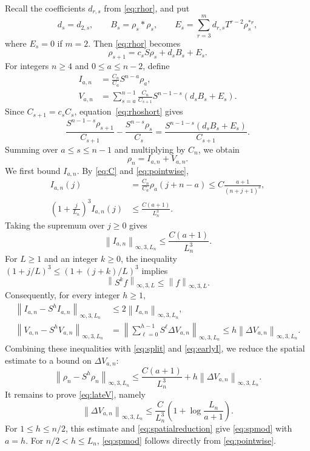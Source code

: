 \documentclass[11pt,letterpaper,reqno]{amsart}
\numberwithin{equation}{section}
\theoremstyle{plain}
\theoremstyle{remark}
\newcommand{\norm}[1]{\left\lVert#1\right\rVert}
\begin{document}
Recall the coefficients $d_{r,s}$ from \eqref{eq:rhor}, and put
\[
 d_s=d_{2,s},\qquad B_s=\rho_s*\rho_s,\qquad
 E_s=\sum_{r=3}^m d_{r,s}T^{r-2}\rho_s^{*r},
\]
where $E_s=0$ if $m=2$. Then \eqref{eq:rhor} becomes
\begin{equation}\label{eq:rhoshort}
 \rho_{s+1}=c_sS\rho_s+d_sB_s+E_s.
\end{equation}
For integers $n\ge4$ and $0\le a\le n-2$, define
\begin{align*}
 I_{a,n}&=\frac{C_n}{C_a}S^{n-a}\rho_a,\\
 V_{a,n}&=\sum_{s=a}^{n-1}\frac{C_n}{C_{s+1}}
                   S^{n-1-s}(d_sB_s+E_s).
\end{align*}
Since $C_{s+1}=c_sC_s$, equation~\eqref{eq:rhoshort} gives
\[
 \frac{S^{n-1-s}\rho_{s+1}}{C_{s+1}}
 -\frac{S^{n-s}\rho_s}{C_s}
 =\frac{S^{n-1-s}(d_sB_s+E_s)}{C_{s+1}}.
\]
Summing over $a\le s\le n-1$ and multiplying by $C_n$, we obtain
\begin{equation}\label{eq:split}
 \rho_n=I_{a,n}+V_{a,n}.
\end{equation}
We first bound $I_{a,n}$. By \eqref{eq:C} and \eqref{eq:pointwise}, 
\[
 \begin{aligned}
 I_{a,n}(j)
 &=\frac{C_n}{C_a}\rho_a(j+n-a)
 \le C\frac{a+1}{(n+j+1)^3},\\
 \left(1+\frac j{L_n}\right)^3 I_{a,n}(j)
 &\le \frac{C(a+1)}{L_n^3}.
 \end{aligned}
\]
Taking the supremum over $j\ge0$ gives
\begin{equation}\label{eq:earlyI}
 \norm{I_{a,n}}_{\infty,3,L_n}
 \le\frac{C(a+1)}{L_n^3}.
\end{equation}
For $L\ge1$ and an integer $k\ge0$, the inequality
$(1+j/L)^3\le(1+(j+k)/L)^3$ implies
\[
 \norm{S^kf}_{\infty,3,L}\le\norm f_{\infty,3,L}.
\]
Consequently, for every integer $h\ge1$,
\[
 \begin{aligned}
 \norm{I_{a,n}-S^hI_{a,n}}_{\infty,3,L_n}
 &\le2\norm{I_{a,n}}_{\infty,3,L_n},\\
 \norm{V_{a,n}-S^hV_{a,n}}_{\infty,3,L_n}
 &=\left\|\sum_{\ell=0}^{h-1}S^\ell\Delta V_{a,n}
       \right\|_{\infty,3,L_n}
 \le h\norm{\Delta V_{a,n}}_{\infty,3,L_n}.
 \end{aligned}
\]
Combining these inequalities with \eqref{eq:split} and \eqref{eq:earlyI},
we reduce the spatial estimate to a bound on $\Delta V_{a,n}$:
\begin{equation}\label{eq:spatialreduction}
 \norm{\rho_n-S^h\rho_n}_{\infty,3,L_n}
 \le\frac{C(a+1)}{L_n^3}
       +h\norm{\Delta V_{a,n}}_{\infty,3,L_n}.
\end{equation}
It remains to prove \eqref{eq:lateV}, namely
\[
 \norm{\Delta V_{a,n}}_{\infty,3,L_n}
 \le \frac{C}{L_n^3}
       \left(1+\log\frac{L_n}{a+1}\right).
\]
For $1\le h\le n/2$, this estimate and
\eqref{eq:spatialreduction} give \eqref{eq:spmod} with $a=h$.
For $n/2<h\le L_n$, \eqref{eq:spmod} follows directly
from \eqref{eq:pointwise}.
\end{document}
